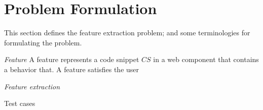 
\section{Problem Formulation} 
This section defines the feature extraction problem; and some terminologies for formulating the problem.

\emph{Feature}
A feature represents a code snippet $CS$ in a web component that contains a behavior that.
A feature satisfies the user

\emph{Feature extraction}

Test cases
